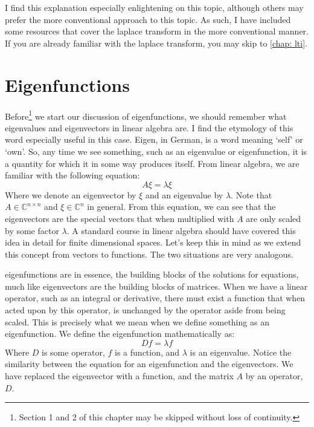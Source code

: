 I find this explanation especially enlightening on this topic, although others may prefer the more conventional approach to this topic. As such, I have included some resources that cover the \gls{laplace transform} in the more conventional manner. If you are already familiar with the \gls{laplace transform}, you may skip to \autoref{chap: lti}.

\section{Eigenfunctions}

Before\footnote{Section 1 and 2 of this chapter may be skipped without loss of continuity.} we start our discussion of \glspl{eigenfunction}, we should remember what eigenvalues and eigenvectors in linear algebra are. I find the etymology of this word especially useful in this case. Eigen, in German, is a word meaning `self' or `own'. So, any time we see something, such as an eigenvalue or \gls{eigenfunction}, it is a quantity for which it in some way produces itself. From linear algebra, we are familiar with the following equation:
$$A\xi=\lambda\xi$$
Where we denote an eigenvector by $\xi$ and an eigenvalue by $\lambda$. Note that $A\in\mathbb{C}^{n\times n}$ and $\xi\in\mathbb{C}^n$ in general. From this equation, we can see that the eigenvectors are the special vectors that when multiplied with $A$ are only scaled by some factor $\lambda$. A standard course in linear algebra should have covered this idea in detail for finite dimensional spaces. Let's keep this in mind as we extend this concept from vectors to functions. The two situations are very analogous.

\Glspl{eigenfunction} are in essence, the building blocks of the solutions for equations, much like eigenvectors are the building blocks of matrices. When we have a linear operator, such as an integral or derivative, there must exist a function that when acted upon by this operator, is unchanged by the operator aside from being scaled. This is precisely what we mean when we define something as an \gls{eigenfunction}.  We define the eigenfunction mathematically as:
$$Df=\lambda f$$
Where $D$ is some operator, $f$ is a function, and $\lambda$ is an eigenvalue. Notice the similarity between the equation for an eigenfunction and the eigenvectors.  We have replaced the eigenvector with a function, and the matrix $A$ by an operator, $D$.

